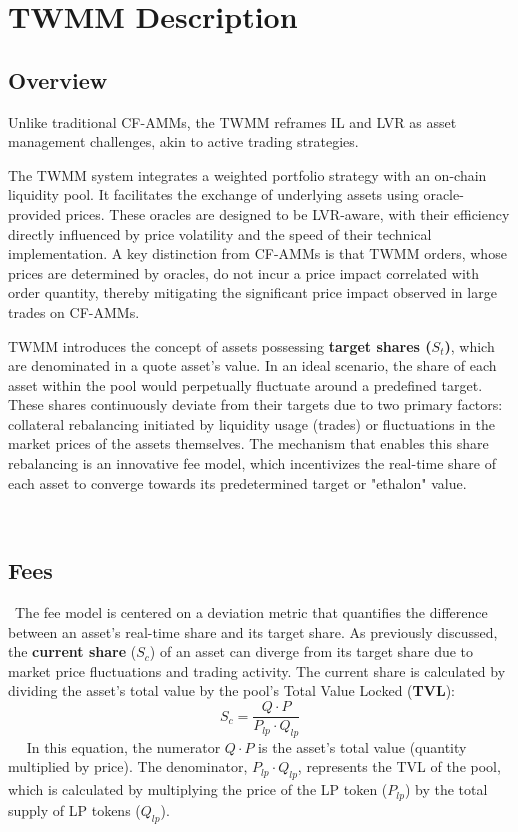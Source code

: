 \section{TWMM Description}
\subsection{Overview}
Unlike traditional CF-AMMs, the TWMM reframes IL and LVR as asset management challenges, akin to active trading strategies.

The TWMM system integrates a weighted portfolio strategy with an on-chain liquidity pool. It facilitates the exchange of underlying assets using oracle-provided prices. These oracles are designed to be LVR-aware, with their efficiency directly influenced by price volatility and the speed of their technical implementation. A key distinction from CF-AMMs is that TWMM orders, whose prices are determined by oracles, do not incur a price impact correlated with order quantity, thereby mitigating the significant price impact observed in large trades on CF-AMMs.

TWMM introduces the concept of assets possessing \textbf{target shares ($S_t$)}, which are denominated in a quote asset's value. In an ideal scenario, the share of each asset within the pool would perpetually fluctuate around a predefined target. These shares continuously deviate from their targets due to two primary factors: collateral rebalancing initiated by liquidity usage (trades) or fluctuations in the market prices of the assets themselves. The mechanism that enables this share rebalancing is an innovative fee model, which incentivizes the real-time share of each asset to converge towards its predetermined target or "ethalon" value.

 \subsection{Fees}
 The fee model is centered on a deviation metric that quantifies the difference between an asset's real-time share and its target share. As previously discussed, the \textbf{current share} ($S_c$) of an asset can diverge from its target share due to market price fluctuations and trading activity. The current share is calculated by dividing the asset's total value by the pool's Total Value Locked (\textbf{TVL}):
 
 \begin{equation}
 	\label{eq:current_share}
 	S_c = \frac{Q \cdot P}{P_{lp} \cdot Q_{lp}}
 \end{equation}
 
 In this equation, the numerator $Q \cdot P$ is the asset's total value (quantity multiplied by price). The denominator, $P_{lp} \cdot Q_{lp}$, represents the TVL of the pool, which is calculated by multiplying the price of the LP token ($P_{lp}$) by the total supply of LP tokens ($Q_{lp}$).

